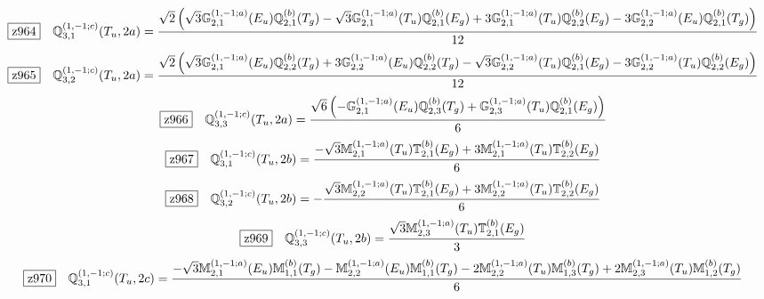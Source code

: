 \documentclass[fleqn,10pt,landscape]{jsarticle}
\begin{document}
\begin{dmath*}
\hspace*{3mm}\fbox{z964}\quad \mathbb{Q}_{3,1}^{(1,-1;c)}(T_{u},2a)=\frac{\sqrt{2} \left(\sqrt{3} \mathbb{G}_{2,1}^{(1,-1;a)}(E_{u}) \mathbb{Q}_{2,1}^{(b)}(T_{g}) - \sqrt{3} \mathbb{G}_{2,1}^{(1,-1;a)}(T_{u}) \mathbb{Q}_{2,1}^{(b)}(E_{g}) + 3 \mathbb{G}_{2,1}^{(1,-1;a)}(T_{u}) \mathbb{Q}_{2,2}^{(b)}(E_{g}) - 3 \mathbb{G}_{2,2}^{(1,-1;a)}(E_{u}) \mathbb{Q}_{2,1}^{(b)}(T_{g})\right)}{12}
\end{dmath*}
\begin{dmath*}
\hspace*{3mm}\fbox{z965}\quad \mathbb{Q}_{3,2}^{(1,-1;c)}(T_{u},2a)=\frac{\sqrt{2} \left(\sqrt{3} \mathbb{G}_{2,1}^{(1,-1;a)}(E_{u}) \mathbb{Q}_{2,2}^{(b)}(T_{g}) + 3 \mathbb{G}_{2,2}^{(1,-1;a)}(E_{u}) \mathbb{Q}_{2,2}^{(b)}(T_{g}) - \sqrt{3} \mathbb{G}_{2,2}^{(1,-1;a)}(T_{u}) \mathbb{Q}_{2,1}^{(b)}(E_{g}) - 3 \mathbb{G}_{2,2}^{(1,-1;a)}(T_{u}) \mathbb{Q}_{2,2}^{(b)}(E_{g})\right)}{12}
\end{dmath*}
\begin{dmath*}
\hspace*{3mm}\fbox{z966}\quad \mathbb{Q}_{3,3}^{(1,-1;c)}(T_{u},2a)=\frac{\sqrt{6} \left(- \mathbb{G}_{2,1}^{(1,-1;a)}(E_{u}) \mathbb{Q}_{2,3}^{(b)}(T_{g}) + \mathbb{G}_{2,3}^{(1,-1;a)}(T_{u}) \mathbb{Q}_{2,1}^{(b)}(E_{g})\right)}{6}
\end{dmath*}
\begin{dmath*}
\hspace*{3mm}\fbox{z967}\quad \mathbb{Q}_{3,1}^{(1,-1;c)}(T_{u},2b)=\frac{- \sqrt{3} \mathbb{M}_{2,1}^{(1,-1;a)}(T_{u}) \mathbb{T}_{2,1}^{(b)}(E_{g}) + 3 \mathbb{M}_{2,1}^{(1,-1;a)}(T_{u}) \mathbb{T}_{2,2}^{(b)}(E_{g})}{6}
\end{dmath*}
\begin{dmath*}
\hspace*{3mm}\fbox{z968}\quad \mathbb{Q}_{3,2}^{(1,-1;c)}(T_{u},2b)=- \frac{\sqrt{3} \mathbb{M}_{2,2}^{(1,-1;a)}(T_{u}) \mathbb{T}_{2,1}^{(b)}(E_{g}) + 3 \mathbb{M}_{2,2}^{(1,-1;a)}(T_{u}) \mathbb{T}_{2,2}^{(b)}(E_{g})}{6}
\end{dmath*}
\begin{dmath*}
\hspace*{3mm}\fbox{z969}\quad \mathbb{Q}_{3,3}^{(1,-1;c)}(T_{u},2b)=\frac{\sqrt{3} \mathbb{M}_{2,3}^{(1,-1;a)}(T_{u}) \mathbb{T}_{2,1}^{(b)}(E_{g})}{3}
\end{dmath*}
\begin{dmath*}
\hspace*{3mm}\fbox{z970}\quad \mathbb{Q}_{3,1}^{(1,-1;c)}(T_{u},2c)=\frac{- \sqrt{3} \mathbb{M}_{2,1}^{(1,-1;a)}(E_{u}) \mathbb{M}_{1,1}^{(b)}(T_{g}) - \mathbb{M}_{2,2}^{(1,-1;a)}(E_{u}) \mathbb{M}_{1,1}^{(b)}(T_{g}) - 2 \mathbb{M}_{2,2}^{(1,-1;a)}(T_{u}) \mathbb{M}_{1,3}^{(b)}(T_{g}) + 2 \mathbb{M}_{2,3}^{(1,-1;a)}(T_{u}) \mathbb{M}_{1,2}^{(b)}(T_{g})}{6}
\end{dmath*}
\end{document}
